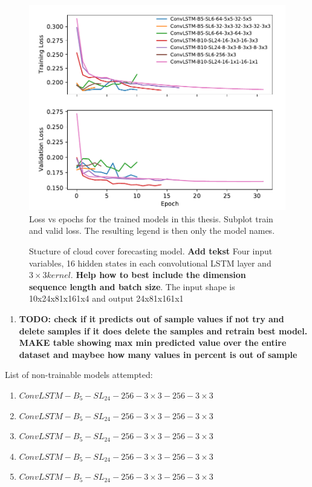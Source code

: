 \begin{figure}
    \centering
    \includegraphics{python_figs/test_epoch_loss.pdf}
    \caption{Loss vs epochs for the trained models in this thesis. Subplot train and valid loss. The resulting legend is then only the model names.}
    \label{fig:convlstm_loss}
\end{figure}

\begin{figure}
    \centering
    
    \caption{Stucture of cloud cover forecasting model. \textbf{Add tekst} Four input variables, 16 hidden states in each convolutional LSTM layer and $3\times 3 kernel$. \textbf{Help how to best include the dimension sequence length and batch size}. The input shape is 10x24x81x161x4 and output 24x81x161x1}
    \label{fig:best_ml_architecture}
\end{figure}

\begin{enumerate}
    \item \textbf{TODO: check if it predicts out of sample values if not try and delete samples if it does delete the samples and retrain best model. MAKE table showing max min predicted value over the entire dataset and maybee how many values in percent is out of sample}
\end{enumerate}

List of non-trainable models attempted:
\begin{enumerate}
    \item $ConvLSTM-B_{5}-SL_{24}-256-3\times3-256-3\times3$
    \item $ConvLSTM-B_{5}-SL_{24}-256-3\times3-256-3\times3$
    \item $ConvLSTM-B_{5}-SL_{24}-256-3\times3-256-3\times3$
    \item $ConvLSTM-B_{5}-SL_{24}-256-3\times3-256-3\times3$
    \item $ConvLSTM-B_{5}-SL_{24}-256-3\times3-256-3\times3$
\end{enumerate}
 
